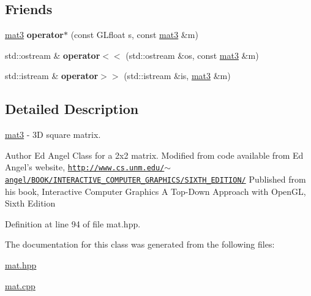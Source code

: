 \subsection*{Friends}
\begin{DoxyCompactItemize}
\item 
\hypertarget{class_angel_1_1mat3_ad9345c93609b63264fb4a4d48cef9e47}{\hyperlink{class_angel_1_1mat3}{mat3} {\bfseries operator$\ast$} (const G\-Lfloat s, const \hyperlink{class_angel_1_1mat3}{mat3} \&m)}\label{class_angel_1_1mat3_ad9345c93609b63264fb4a4d48cef9e47}

\item 
\hypertarget{class_angel_1_1mat3_a85d71885cc6797f2553701eb01c52851}{std\-::ostream \& {\bfseries operator$<$$<$} (std\-::ostream \&os, const \hyperlink{class_angel_1_1mat3}{mat3} \&m)}\label{class_angel_1_1mat3_a85d71885cc6797f2553701eb01c52851}

\item 
\hypertarget{class_angel_1_1mat3_aa6ac075e9f3776b3d6eba3e8207ab990}{std\-::istream \& {\bfseries operator$>$$>$} (std\-::istream \&is, \hyperlink{class_angel_1_1mat3}{mat3} \&m)}\label{class_angel_1_1mat3_aa6ac075e9f3776b3d6eba3e8207ab990}

\end{DoxyCompactItemize}


\subsection{Detailed Description}
\hyperlink{class_angel_1_1mat3}{mat3} -\/ 3\-D square matrix. 

\begin{DoxyAuthor}{Author}
Ed Angel Class for a 2x2 matrix. Modified from code available from Ed Angel's website, \href{http://www.cs.unm.edu/~angel/BOOK/INTERACTIVE_COMPUTER_GRAPHICS/SIXTH_EDITION/}{\tt http\-://www.\-cs.\-unm.\-edu/$\sim$angel/\-B\-O\-O\-K/\-I\-N\-T\-E\-R\-A\-C\-T\-I\-V\-E\-\_\-\-C\-O\-M\-P\-U\-T\-E\-R\-\_\-\-G\-R\-A\-P\-H\-I\-C\-S/\-S\-I\-X\-T\-H\-\_\-\-E\-D\-I\-T\-I\-O\-N/} Published from his book, Interactive Computer Graphics A Top-\/\-Down Approach with Open\-G\-L, Sixth Edition 
\end{DoxyAuthor}


Definition at line 94 of file mat.\-hpp.



The documentation for this class was generated from the following files\-:\begin{DoxyCompactItemize}
\item 
\hyperlink{mat_8hpp}{mat.\-hpp}\item 
\hyperlink{mat_8cpp}{mat.\-cpp}\end{DoxyCompactItemize}
